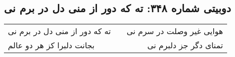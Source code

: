 \begin{center}
\section*{دوبیتی شماره ۳۴۸: ته که دور از منی دل در برم نی}
\label{sec:348}
\begin{longtable}{l p{0.5cm} r}
ته که دور از منی دل در برم نی
&&
هوایی غیر وصلت در سرم نی
\\
بجانت دلبرا کز هر دو عالم
&&
تمنای دگر جز دلبرم نی
\\
\end{longtable}
\end{center}

